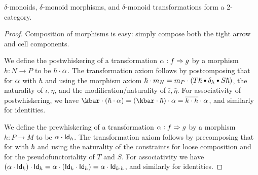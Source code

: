 \documentclass{amsart}
\let\tc\cdot
\newcommand{\bc}{\mathbin{\raisebox{1pt}{\scriptsize$\bullet$}}}
\newcommand{\hunit}[1]{\Id_{#1}}
\newcommand{\Tunit}{\iota}
\newcommand{\Sunit}{\eta}
\newcommand{\dl}{\delta}
\newcommand{\Tdlunit}{\bar\Tunit}%
\newcommand{\Sdlunit}{\bar\Sunit}%
\newcommand{\Id}{\mathsf{Id}}
\begin{document}
\begin{thm}
  $\dl$-monoids, $\dl$-monoid morphisms, and $\dl$-monoid transformations form a 2-category.
\end{thm}
\begin{proof}
  Composition of morphisms is easy: simply compose both the tight arrow and cell components.

  We define the postwhiskering of a transformation $\alpha:f\Rightarrow g$ by a morphism $h:N\to P$ to be $\hbar\tc \al$.
  The transformation axiom follows by postcomposing that for $\alpha$ with $\hbar$ and using the morphism axiom $\hbar \tc m_N = m_P \tc (T\hbar \bc \dl_h \bc S\hbar)$, the naturality of $\Tunit,\Sunit$, and the modification/naturality of $\Tdlunit,\Sdlunit$.
  For associativity of postwhiskering, we have $\kbar \tc (\hbar \tc \al) = (\kbar \tc \hbar)\tc \al = \overline{k\tc h} \tc\al$, and similarly for identities.

  We define the prewhiskering of a transformation $\alpha:f\Rightarrow g$ by a morphism $h:P\to M$ to be $\al \tc \hunit{h}$.
  The transformation axiom follows by precomposing that for \al with $\hbar$ and using the naturality of the constraints for loose composition and for the pseudofunctoriality of $T$ and $S$.
  For associativity we have $(\al\tc\hunit{k})\tc\hunit{h} = \al\tc(\hunit{k}\tc\hunit{h}) = \al\tc\hunit{k\tc h}$, and similarly for identities.


\end{proof}
\end{document}
